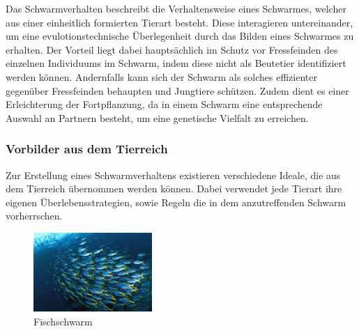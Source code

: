 Das Schwarmverhalten beschreibt die Verhaltensweise eines Schwarmes, welcher aus einer einheitlich formierten Tierart besteht.  Diese interagieren untereinander, um eine evulotionstechnische Überlegenheit durch das Bilden eines Schwarmes zu erhalten. Der Vorteil liegt dabei hauptsächlich im Schutz vor Fressfeinden des einzelnen Individuums im Schwarm, indem diese nicht als Beutetier identifiziert werden können. Andernfalls kann sich der Schwarm als solches effizienter gegenüber Fressfeinden behaupten und Jungtiere schützen. Zudem dient es einer Erleichterung der Fortpflanzung, da in einem Schwarm eine entsprechende Auswahl an Partnern besteht, um eine genetische Vielfalt zu erreichen.
\color{process}
\subsubsection{Vorbilder aus dem Tierreich}

Zur Erstellung eines Schwarmverhaltens existieren verschiedene Ideale, die aus dem Tierreich übernommen werden können. Dabei verwendet jede Tierart ihre eigenen Überlebensstrategien, sowie Regeln die in dem anzutreffenden Schwarm vorherrschen.%
\begin{figure}
	\begin{center}
		\includegraphics[width=0.4\textwidth]{images/technische_grundlagen/fischschwarm.jpg}
	\end{center}
	\caption{Fischschwarm}
	\label{fig:fischschwarm}
\end{figure}

\noindent

